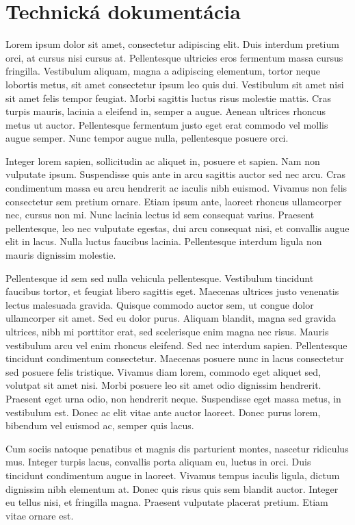 \newpage
\thispagestyle{plain}

\section{Technická dokumentácia}\label{technical_documentation}

Lorem ipsum dolor sit amet, consectetur adipiscing elit. Duis interdum pretium orci, at cursus nisi cursus at. Pellentesque ultricies eros fermentum massa cursus fringilla. Vestibulum aliquam, magna a adipiscing elementum, tortor neque lobortis metus, sit amet consectetur ipsum leo quis dui. Vestibulum sit amet nisi sit amet felis tempor feugiat. Morbi sagittis luctus risus molestie mattis. Cras turpis mauris, lacinia a eleifend in, semper a augue. Aenean ultrices rhoncus metus ut auctor. Pellentesque fermentum justo eget erat commodo vel mollis augue semper. Nunc tempor augue nulla, pellentesque posuere orci.

Integer lorem sapien, sollicitudin ac aliquet in, posuere et sapien. Nam non vulputate ipsum. Suspendisse quis ante in arcu sagittis auctor sed nec arcu. Cras condimentum massa eu arcu hendrerit ac iaculis nibh euismod. Vivamus non felis consectetur sem pretium ornare. Etiam ipsum ante, laoreet rhoncus ullamcorper nec, cursus non mi. Nunc lacinia lectus id sem consequat varius. Praesent pellentesque, leo nec vulputate egestas, dui arcu consequat nisi, et convallis augue elit in lacus. Nulla luctus faucibus lacinia. Pellentesque interdum ligula non mauris dignissim molestie.

Pellentesque id sem sed nulla vehicula pellentesque. Vestibulum tincidunt faucibus tortor, et feugiat libero sagittis eget. Maecenas ultrices justo venenatis lectus malesuada gravida. Quisque commodo auctor sem, ut congue dolor ullamcorper sit amet. Sed eu dolor purus. Aliquam blandit, magna sed gravida ultrices, nibh mi porttitor erat, sed scelerisque enim magna nec risus. Mauris vestibulum arcu vel enim rhoncus eleifend. Sed nec interdum sapien. Pellentesque tincidunt condimentum consectetur. Maecenas posuere nunc in lacus consectetur sed posuere felis tristique. Vivamus diam lorem, commodo eget aliquet sed, volutpat sit amet nisi. Morbi posuere leo sit amet odio dignissim hendrerit. Praesent eget urna odio, non hendrerit neque. Suspendisse eget massa metus, in vestibulum est. Donec ac elit vitae ante auctor laoreet. Donec purus lorem, bibendum vel euismod ac, semper quis lacus.

Cum sociis natoque penatibus et magnis dis parturient montes, nascetur ridiculus mus. Integer turpis lacus, convallis porta aliquam eu, luctus in orci. Duis tincidunt condimentum augue in laoreet. Vivamus tempus iaculis ligula, dictum dignissim nibh elementum at. Donec quis risus quis sem blandit auctor. Integer eu tellus nisi, et fringilla magna. Praesent vulputate placerat pretium. Etiam vitae ornare est.


